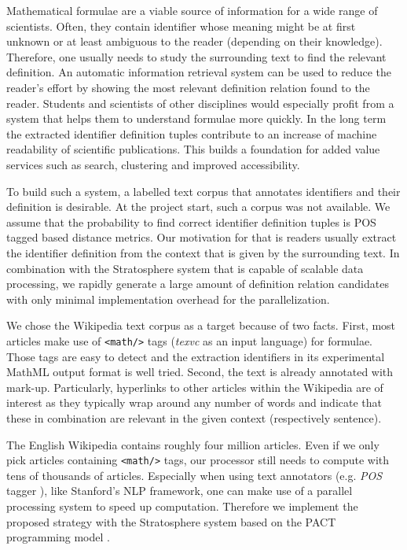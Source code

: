 \documentclass[runningheads]{llncs}
\begin{document}
Mathematical formulae are a viable source of information for a wide range of
scientists. Often, they contain identifier whose meaning might be at first
unknown or at least ambiguous to the reader (depending on their knowledge).
Therefore, one usually needs to study the surrounding text to find the
relevant definition. An automatic information retrieval system can be used to
reduce the reader's effort by showing the most relevant definition relation
found to the reader. Students and scientists of other disciplines would
especially profit from a system that helps them to understand formulae more
quickly. In the long term the extracted identifier definition tuples contribute
to an increase of machine readability of scientific publications. This builds a 
foundation for added value services such as search, clustering and improved
accessibility.


To build such a system, a labelled text corpus that annotates identifiers and
their definition is desirable. At the project start, such a corpus was not
available. 
We assume that the probability to find correct identifier definition tuples is
POS tagged based distance metrics.
Our motivation for that is readers usually extract the identifier definition
from the context that is given by the surrounding text.
In combination with the Stratosphere system
that is capable of scalable data processing,  we rapidly generate a large
amount of definition relation candidates with only minimal implementation
overhead for the parallelization.


We chose the Wikipedia text corpus as a target because of two facts. First,
most articles make use of \texttt{<math/>} tags (\emph{texvc} as an input
language) for formulae. Those tags are easy to detect and the extraction identifiers
in its experimental MathML output format is well tried. 
Second, the text is already annotated with mark-up.
Particularly, hyperlinks to other articles within the Wikipedia are of
interest as they typically wrap around any number of words and indicate that
these in combination are relevant in the given context (respectively
sentence).


The English Wikipedia contains roughly four million articles. Even if we only
pick articles containing \texttt{<math/>} tags, our processor still needs to
compute with tens of thousands of articles. Especially when using text
annotators (e.g. \emph{POS} tagger \cite{Rathna96}), like Stanford's NLP
framework, one can make use of a parallel processing system to speed up
computation. Therefore we implement the proposed strategy with the
Stratosphere system based on the PACT programming model \cite{Alexandrov2010}.
\end{document}

